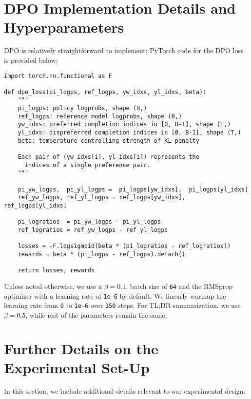 \documentclass{article}
\begin{document}
\section{DPO Implementation Details and Hyperparameters}
\label{app:implementation}
DPO is relatively straightforward to implement; PyTorch code for the DPO loss is provided below:
\clearpage
\begin{verbatim}
import torch.nn.functional as F

def dpo_loss(pi_logps, ref_logps, yw_idxs, yl_idxs, beta):
    """
    pi_logps: policy logprobs, shape (B,)
    ref_logps: reference model logprobs, shape (B,)
    yw_idxs: preferred completion indices in [0, B-1], shape (T,)
    yl_idxs: dispreferred completion indices in [0, B-1], shape (T,)
    beta: temperature controlling strength of KL penalty

    Each pair of (yw_idxs[i], yl_idxs[i]) represents the
      indices of a single preference pair.
    """

    pi_yw_logps,  pi_yl_logps =  pi_logps[yw_idxs],  pi_logps[yl_idxs]
    ref_yw_logps, ref_yl_logps = ref_logps[yw_idxs], ref_logps[yl_idxs]

    pi_logratios  = pi_yw_logps - pi_yl_logps
    ref_logratios = ref_yw_logps - ref_yl_logps

    losses = -F.logsigmoid(beta * (pi_logratios - ref_logratios))
    rewards = beta * (pi_logps - ref_logps).detach()

    return losses, rewards
\end{verbatim}

Unless noted otherwise, we use a $\beta = 0.1$, batch size of \texttt{64} and the RMSprop optimizer with a learning rate of \texttt{1e-6} by default. We linearly warmup the learning rate from \texttt{0} to \texttt{1e-6} over \texttt{150} steps. For TL;DR summarization, we use $\beta=0.5$, while rest of the parameters remain the same.


\section{Further Details on the Experimental Set-Up}
\label{app:exp_details}
In this section, we include additional details relevant to our experimental design.
\end{document}

